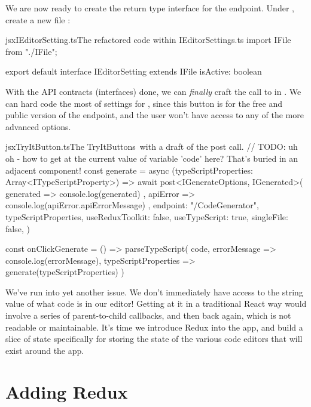 \documentclass[paper=6in:9in,pagesize=pdftex,headinclude=on,footinclude=on,12pt,twoside]{scrbook}
\begin{document}

We are now ready to create the return type interface for the  endpoint. Under , create a new file : 

\begin{codeInput}{jsx}{IEditorSetting.ts}{The refactored code within IEditorSettings.ts}
import IFile from "./IFile";

export default interface IEditorSetting extends IFile {
  isActive: boolean
}  
\end{codeInput}

With the API contracts (interfaces) done, we can \textit{finally} craft the call to  in . We can hard code the most of settings for , since this button is for the free and public version of the endpoint, and the user won't have access to any of the more advanced options.

\begin{codeInput}{jsx}{TryItButton.ts}{The TryItButtons\, with a draft of the post call.}
// TODO: uh oh - how to get at the current value of variable 'code' here? That's buried in an adjacent component!
const generate = async (typeScriptProperties: Array<ITypeScriptProperty>) => {
  await post<IGenerateOptions, IGenerated>(
    generated => {
      console.log(generated)
    },
    apiError => {
      console.log(apiError.apiErrorMessage)
    },
    {
      endpoint: "/CodeGenerator",
      typeScriptProperties,
      useReduxToolkit: false,
      useTypeScript: true,
      singleFile: false,
    }
  )
}

const onClickGenerate = () =>
  parseTypeScript(
    code,
    errorMessage => console.log(errorMessage),
    typeScriptProperties => generate(typeScriptProperties)
  )
\end{codeInput}

We've run into yet another issue. We don't immediately have access to the string value of what code is in our editor! Getting at it in a traditional React way would involve a series of parent-to-child callbacks, and then back again, which is not readable or maintainable. It's time we introduce Redux into the app, and build a slice of state specifically for storing the state of the various code editors that will exist around the app.

\section{Adding Redux}
\end{document}
